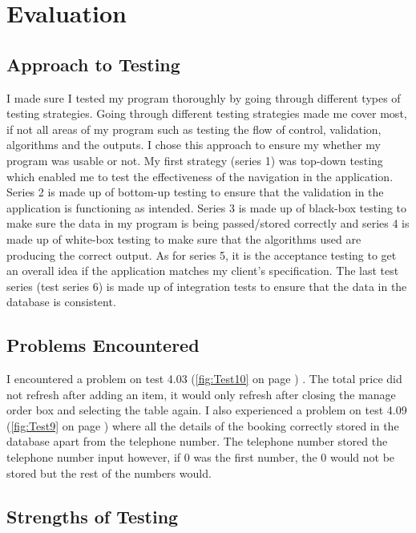 \section{Evaluation}

\subsection{Approach to Testing}

I made sure I tested my program thoroughly by going through different types of testing strategies. Going through different testing strategies made me cover most, if not all areas of my program such as testing the flow of control, validation, algorithms and the outputs.  I chose this approach to ensure my whether my program was usable or not. My first strategy (series 1) was top-down testing which enabled me to test the effectiveness of the navigation in the application. Series 2 is made up of bottom-up testing to ensure that the validation in the application is functioning as intended. Series 3 is made up of black-box testing to make sure the data in my program is being passed/stored correctly and series 4 is made up of white-box testing to make sure that the algorithms used are producing the correct output. As for series 5, it is the acceptance testing to get an overall idea if the application matches my client's specification. The last test series (test series 6) is made up of integration tests to ensure that the data in the database is consistent.

\subsection{Problems Encountered}

I encountered a problem on test 4.03 (\ref{fig:Test10} on page \pageref{fig:Test10}) . The total price did not refresh after adding an item, it would only refresh after closing the manage order box and selecting the table again. I also experienced a problem on test 4.09 (\ref{fig:Test9} on page \pageref{fig:Test9}) where all the details of the booking correctly stored in the database apart from the telephone number. The telephone number stored the telephone number input however, if 0 was the first number, the 0 would not be stored but the rest of the numbers would.

\subsection{Strengths of Testing}

